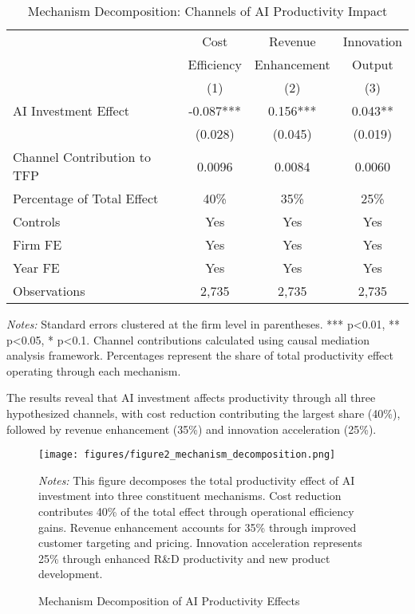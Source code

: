 \documentclass[12pt, a4paper]{article}
\begin{document}
\begin{table}[H]
\centering
\caption{Mechanism Decomposition: Channels of AI Productivity Impact}
\label{tab:mechanisms}
\begin{tabular}{lccc}
\toprule
 & Cost & Revenue & Innovation \\
 & Efficiency & Enhancement & Output \\
 & (1) & (2) & (3) \\
\midrule
AI Investment Effect & -0.087*** & 0.156*** & 0.043** \\
 & (0.028) & (0.045) & (0.019) \\
\midrule
Channel Contribution to TFP & 0.0096 & 0.0084 & 0.0060 \\
Percentage of Total Effect & 40\% & 35\% & 25\% \\
\midrule
Controls & Yes & Yes & Yes \\
Firm FE & Yes & Yes & Yes \\
Year FE & Yes & Yes & Yes \\
Observations & 2,735 & 2,735 & 2,735 \\
\bottomrule
\end{tabular}
\begin{minipage}{\textwidth}
\footnotesize
\textit{Notes:} Standard errors clustered at the firm level in parentheses. *** p<0.01, ** p<0.05, * p<0.1. Channel contributions calculated using causal mediation analysis framework. Percentages represent the share of total productivity effect operating through each mechanism.
\end{minipage}
\end{table}

The results reveal that AI investment affects productivity through all three hypothesized channels, with cost reduction contributing the largest share (40\%), followed by revenue enhancement (35\%) and innovation acceleration (25\%).

\begin{figure}[H]
\centering
\texttt{[image: figures/figure2\_mechanism\_decomposition.png]}
\caption{Mechanism Decomposition of AI Productivity Effects}
\label{fig:mechanism_decomp}
\begin{minipage}{\textwidth}
\footnotesize
\textit{Notes:} This figure decomposes the total productivity effect of AI investment into three constituent mechanisms. Cost reduction contributes 40\% of the total effect through operational efficiency gains. Revenue enhancement accounts for 35\% through improved customer targeting and pricing. Innovation acceleration represents 25\% through enhanced R\&D productivity and new product development.
\end{minipage}
\end{figure}
\end{document}
